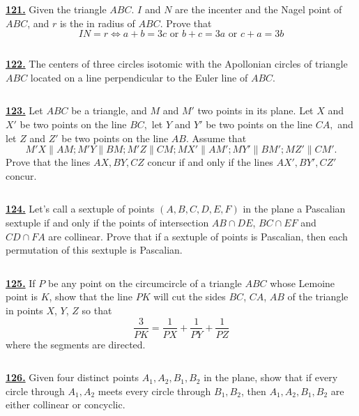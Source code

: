 \documentclass{article}
\begin{document}
\href{ http://www.artofproblemsolving.com/Forum/viewtopic.php?p=144399#p144399
}{\bf 121.} Given the triangle $ABC.$ $I$ and $N$ are the incenter and the Nagel point of $ABC$, and $r$ is the in radius of $ABC.$ Prove that
$$IN=r \iff  a+b=3c \text{ or } b+c=3a \text{ or } c+a=3b$$


$$ $$


\href{http://www.artofproblemsolving.com/Forum/viewtopic.php?p=149725#p149725
 }{\bf 122.} The centers of three circles isotomic with the Apollonian circles of triangle $ABC$ located on a line perpendicular to the Euler line of $ABC.$


$$ $$


\href{http://www.artofproblemsolving.com/Forum/viewtopic.php?p=10533#p10533
 }{\bf 123.} Let $ABC$ be a triangle, and $M$ and $M'$ two points in its plane. Let $X$ and $X'$ be two points on the line $BC,$ let $Y$ and $Y'$ be two points on the line $CA,$ and let $Z$ and $Z'$ be two points on the line $AB.$ Assume that
$$M'X  \parallel  AM; M'Y \parallel  BM; M'Z \parallel  CM; MX' \parallel  AM'; MY' \parallel  BM'; MZ' \parallel  CM'. $$
Prove that the lines $AX, BY, CZ$ concur if and only if the lines $AX', BY', CZ'$ concur.


$$ $$


\href{http://www.artofproblemsolving.com/Forum/viewtopic.php?p=154202#p154202
 }{\bf 124.} Let's call a sextuple of points $(A, B, C, D, E, F)$ in the plane a Pascalian sextuple if and only if the points of intersection $AB\cap DE$, $BC\cap EF$ and $CD\cap FA$ are collinear.
Prove that if a sextuple of points is Pascalian, then each permutation of this sextuple is Pascalian.


$$ $$


\href{http://www.artofproblemsolving.com/Forum/viewtopic.php?p=157209#p157209
 }{\bf 125.} If $ P$ be any point on the circumcircle of a triangle $ ABC$ whose Lemoine point is $ K$, show that the line $ PK$ will cut the sides $ BC$, $ CA$, $ AB$ of the triangle in points $ X$, $ Y$, $ Z$ so that
$$ \frac{3}{{PK}}=\frac{1}{{PX}}+\frac{1}{{PY}}+\frac{1}{{PZ}}$$
where the segments are directed.


$$ $$


\href{http://www.artofproblemsolving.com/Forum/viewtopic.php?p=121765#p121765
 }{\bf 126.} Given four distinct points $A_1,A_2,B_1,B_2$ in the plane, show that if every circle through $A_1,A_2$ meets every circle through $B_1,B_2$, then $A_1,A_2,B_1,B_2$ are either collinear or concyclic.
\end{document}
